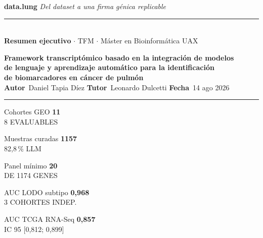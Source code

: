 \documentclass[10pt, a4paper, landscape]{article}
\newcommand{\bignum}[1]{{\fontsize{20pt}{20pt}\selectfont\color{verdeTerm}\textbf{#1}}}
\newcommand{\lbl}[1]{{\ttfamily\scriptsize\color{mute}\MakeUppercase{#1}}}
\begin{document}
\noindent
\begin{minipage}[c]{0.55\textwidth}
  {\ttfamily\fontsize{28pt}{28pt}\selectfont\bfseries
   data\textcolor{verdeTerm}{.}lung}\quad
  {\small\itshape\color{tinta2}Del dataset a una firma g\'enica replicable}\\[0.15em]
  \textcolor{verdeTerm}{\rule{2cm}{1.2pt}}\\[0.15em]
  {\small\bfseries\color{tinta}Resumen ejecutivo}\;
  {\scriptsize\color{tinta2}$\cdot$ TFM $\cdot$ M\'aster en Bioinform\'atica UAX}
\end{minipage}%
\hfill
\begin{minipage}[c]{0.44\textwidth}
  \raggedleft\scriptsize
  \textbf{Framework transcript\'omico basado en la integraci\'on de modelos\\
  de lenguaje y aprendizaje autom\'atico para la identificaci\'on\\
  de biomarcadores en c\'ancer de pulm\'on}\\[0.35em]
  {\color{mute}\textbf{Autor}}~Daniel Tapia D\'iez\quad
  {\color{mute}\textbf{Tutor}}~Leonardo Dulcetti\quad
  {\color{mute}\textbf{Fecha}}~14 ago 2026
\end{minipage}

\vspace{0.15em}
\textcolor{linea}{\rule{\textwidth}{0.5pt}}
\vspace{0.15em}

\noindent
\begin{minipage}[t]{0.195\textwidth}\begin{kpi}{Cohortes GEO}
  \bignum{11}\\\lbl{8 evaluables}
\end{kpi}\end{minipage}\hfill
\begin{minipage}[t]{0.195\textwidth}\begin{kpi}{Muestras curadas}
  \bignum{1157}\\\lbl{82{,}8\,\% LLM}
\end{kpi}\end{minipage}\hfill
\begin{minipage}[t]{0.195\textwidth}\begin{kpi}{Panel m\'inimo}
  \bignum{20}\\\lbl{de 1174 genes}
\end{kpi}\end{minipage}\hfill
\begin{minipage}[t]{0.195\textwidth}\begin{kpi}{AUC LODO subtipo}
  \bignum{0{,}968}\\\lbl{3 cohortes indep.}
\end{kpi}\end{minipage}\hfill
\begin{minipage}[t]{0.195\textwidth}\begin{kpi}{AUC TCGA RNA-Seq}
  \bignum{0{,}857}\\\lbl{IC 95 [0{,}812; 0{,}899]}
\end{kpi}\end{minipage}
\end{document}
